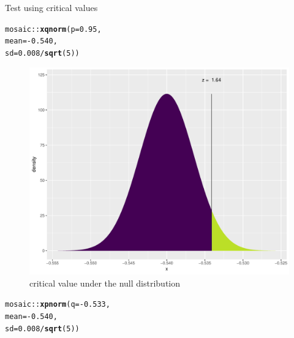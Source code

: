 \documentclass{beamer}\usepackage[]{graphicx}\usepackage[]{color}
\newcommand{\hlnum}[1]{\textcolor[rgb]{0.686,0.059,0.569}{#1}}%
\newcommand{\hlopt}[1]{\textcolor[rgb]{0,0,0}{#1}}%
\newcommand{\hlstd}[1]{\textcolor[rgb]{0.345,0.345,0.345}{#1}}%
\newcommand{\hlkwc}[1]{\textcolor[rgb]{0.333,0.667,0.333}{#1}}%
\newcommand{\hlkwd}[1]{\textcolor[rgb]{0.737,0.353,0.396}{\textbf{#1}}}%
\newenvironment{knitrout}{}{} %
\begin{document}
\begin{frame}[fragile]{Test using critical values}


	\begin{minipage}{0.47\textwidth}
\begin{knitrout}\scriptsize
{}\color{fgcolor}
\begin{alltt}
\hlstd{mosaic}\hlopt{::}\hlkwd{xqnorm}\hlstd{(}\hlkwc{p} \hlstd{=} \hlnum{0.95}\hlstd{,}
\hlkwc{mean} \hlstd{=} \hlopt{-}\hlnum{0.540}\hlstd{,}
\hlkwc{sd} \hlstd{=} \hlnum{0.008}\hlopt{/}\hlkwd{sqrt}\hlstd{(}\hlnum{5}\hlstd{))}
\end{alltt}
\begin{figure}

{\centering \includegraphics[width=1\linewidth]{figure/unnamed-chunk-4-1} 

}

\caption[critical value under the null distribution]{critical value under the null distribution}\label{fig:unnamed-chunk-4}
\end{figure}


\end{knitrout}
	\end{minipage}
	\begin{minipage}{0.47\textwidth}
\begin{knitrout}\scriptsize
{}\color{fgcolor}
\begin{alltt}
\hlstd{mosaic}\hlopt{::}\hlkwd{xpnorm}\hlstd{(}\hlkwc{q} \hlstd{=} \hlopt{-}\hlnum{0.533}\hlstd{,}
\hlkwc{mean} \hlstd{=} \hlopt{-}\hlnum{0.540}\hlstd{,}
\hlkwc{sd} \hlstd{=} \hlnum{0.008}\hlopt{/}\hlkwd{sqrt}\hlstd{(}\hlnum{5}\hlstd{))}
\end{alltt}
\begin{figure}


\end{figure}
\end{knitrout}
\end{minipage}
\end{frame}
\end{document}
